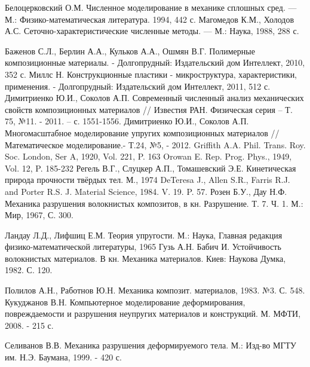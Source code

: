 \begin{thebibliography}{99}
Белоцерковский О.М. Численное моделирование в механике
сплошных сред. — М.: Физико-математическая литература. 1994, 442 с.
Магомедов К.М., Холодов А.С. Сеточно-характеристические
численные методы. — М.: Наука, 1988, 288 с.

Баженов С.Л., Берлин А.А., Кульков А.А., Ошмян В.Г. Полимерные композиционные материалы. - Долгопрудный: Издательский дом Интеллект, 2010, 352 с.
Миллс Н. Конструкционные пластики - микроструктура, характеристики, применения. - Долгопрудный: Издательский дом Интеллект, 2011, 512 с.
Димитриенко Ю.И., Соколов А.П. Современный численный анализ механических свойств композиционных материалов // Известия РАН. Физическая серия – Т. 75, №11. - 2011. – с. 1551-1556. 
Димитриенко Ю.И., Соколов А.П. Многомасштабное моделирование упругих композиционных материалов // Математическое моделирование.- Т.24, №5, - 2012.
Griffith A.A. Phil. Trans. Roy. Soc. London, Ser A, 1920, Vol. 221, P. 163
 Orowan E. Rep. Prog. Phys., 1949, Vol. 12, P. 185-232
Регель В.Г., Слуцкер А.П., Томашевский Э.Е. Кинетическая природа прочности твёрдых тел. М., 1974
DeTeresa J., Allen S.R., Farris R.J. and Porter R.S. J. Material Science, 1984. V. 19. P. 57.
Розен Б.У., Дау Н.Ф. Механика разрушения волокнистых композитов, в кн. Разрушение. Т. 7. Ч. 1. М.: Мир, 1967, С. 300.

Ландау Л.Д., Лифшиц Е.М. Теория упругости. М.: Наука, Главная редакция физико-математической литературы, 1965
Гузь А.Н. Бабич И. Устойчивость волокнистых материалов. В кн. Механика материалов. Киев: Наукова Думка, 1982. С. 120.

Полилов А.Н., Работнов Ю.Н. Механика композит. материалов, 1983. №3. С. 548.
Кукуджанов В.Н. Компьютерное моделирование деформирования, повреждаемости и разрушения неупругих материалов и конструкций. М. МФТИ, 2008. - 215 с.

Селиванов В.В. Механика разрушения деформируемого тела. М.: Изд-во МГТУ им. Н.Э. Баумана, 1999. - 420 с.


\end{thebibliography}
